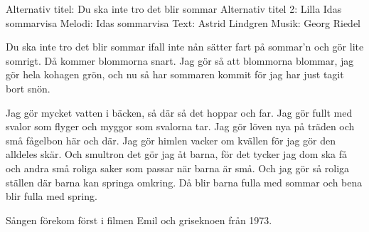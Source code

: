 \begin{song}


\begin{songmeta}
Alternativ titel: Du ska inte tro det blir sommar
Alternativ titel 2: Lilla Idas sommarvisa
Melodi: Idas sommarvisa
Text: Astrid Lindgren
Musik: Georg Riedel
\end{songmeta}

\begin{songtext}
Du ska inte tro det blir sommar
ifall inte nån sätter fart
på sommar'n och gör lite somrigt.
Då kommer blommorna snart.
Jag gör så att blommorna blommar,
jag gör hela kohagen grön,
och nu så har sommaren kommit
för jag har just tagit bort snön.

Jag gör mycket vatten i bäcken,
så där så det hoppar och far.
Jag gör fullt med svalor som flyger
och myggor som svalorna tar.
Jag gör löven nya på träden
och små fågelbon här och där.
Jag gör himlen vacker om kvällen
för jag gör den alldeles skär.
\newpage
Och smultron det gör jag åt barna,
för det tycker jag dom ska få
och andra små roliga saker
som passar när barna är små.
Och jag gör så roliga ställen
där barna kan springa omkring.
Då blir barna fulla med sommar
och bena blir fulla med spring.
\end{songtext}

\begin{songnotes}
Sången förekom först i filmen Emil och griseknoen från 1973.
\end{songnotes}

\end{song}
